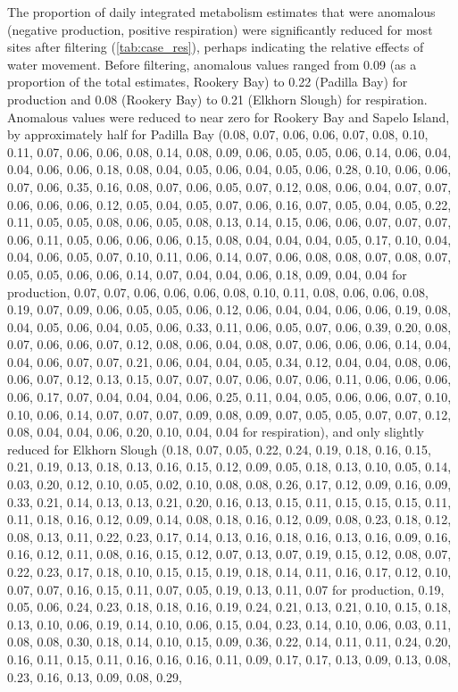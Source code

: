 \documentclass[letterpaper,12pt,oneside]{article}\usepackage[]{graphicx}\usepackage[]{color}
\begin{document}
The proportion of daily integrated metabolism estimates that were anomalous (negative production, positive respiration) were significantly reduced for most sites after filtering (\cref{tab:case_res}), perhaps indicating the relative effects of water movement.  Before filtering, anomalous values ranged from 0.09 (as a proportion of the total estimates, Rookery Bay) to 0.22 (Padilla Bay) for production and 0.08 (Rookery Bay) to 0.21 (Elkhorn Slough) for respiration. Anomalous values were reduced to near zero for Rookery Bay and Sapelo Island, by approximately half for Padilla Bay (0.08, 0.07, 0.06, 0.06, 0.07, 0.08, 0.10, 0.11, 0.07, 0.06, 0.06, 0.08, 0.14, 0.08, 0.09, 0.06, 0.05, 0.05, 0.06, 0.14, 0.06, 0.04, 0.04, 0.06, 0.06, 0.18, 0.08, 0.04, 0.05, 0.06, 0.04, 0.05, 0.06, 0.28, 0.10, 0.06, 0.06, 0.07, 0.06, 0.35, 0.16, 0.08, 0.07, 0.06, 0.05, 0.07, 0.12, 0.08, 0.06, 0.04, 0.07, 0.07, 0.06, 0.06, 0.06, 0.12, 0.05, 0.04, 0.05, 0.07, 0.06, 0.16, 0.07, 0.05, 0.04, 0.05, 0.22, 0.11, 0.05, 0.05, 0.08, 0.06, 0.05, 0.08, 0.13, 0.14, 0.15, 0.06, 0.06, 0.07, 0.07, 0.07, 0.06, 0.11, 0.05, 0.06, 0.06, 0.06, 0.15, 0.08, 0.04, 0.04, 0.04, 0.05, 0.17, 0.10, 0.04, 0.04, 0.06, 0.05, 0.07, 0.10, 0.11, 0.06, 0.14, 0.07, 0.06, 0.08, 0.08, 0.07, 0.08, 0.07, 0.05, 0.05, 0.06, 0.06, 0.14, 0.07, 0.04, 0.04, 0.06, 0.18, 0.09, 0.04, 0.04 for production, 0.07, 0.07, 0.06, 0.06, 0.06, 0.08, 0.10, 0.11, 0.08, 0.06, 0.06, 0.08, 0.19, 0.07, 0.09, 0.06, 0.05, 0.05, 0.06, 0.12, 0.06, 0.04, 0.04, 0.06, 0.06, 0.19, 0.08, 0.04, 0.05, 0.06, 0.04, 0.05, 0.06, 0.33, 0.11, 0.06, 0.05, 0.07, 0.06, 0.39, 0.20, 0.08, 0.07, 0.06, 0.06, 0.07, 0.12, 0.08, 0.06, 0.04, 0.08, 0.07, 0.06, 0.06, 0.06, 0.14, 0.04, 0.04, 0.06, 0.07, 0.07, 0.21, 0.06, 0.04, 0.04, 0.05, 0.34, 0.12, 0.04, 0.04, 0.08, 0.06, 0.06, 0.07, 0.12, 0.13, 0.15, 0.07, 0.07, 0.07, 0.06, 0.07, 0.06, 0.11, 0.06, 0.06, 0.06, 0.06, 0.17, 0.07, 0.04, 0.04, 0.04, 0.06, 0.25, 0.11, 0.04, 0.05, 0.06, 0.06, 0.07, 0.10, 0.10, 0.06, 0.14, 0.07, 0.07, 0.07, 0.09, 0.08, 0.09, 0.07, 0.05, 0.05, 0.07, 0.07, 0.12, 0.08, 0.04, 0.04, 0.06, 0.20, 0.10, 0.04, 0.04 for respiration), and only slightly reduced for Elkhorn Slough (0.18, 0.07, 0.05, 0.22, 0.24, 0.19, 0.18, 0.16, 0.15, 0.21, 0.19, 0.13, 0.18, 0.13, 0.16, 0.15, 0.12, 0.09, 0.05, 0.18, 0.13, 0.10, 0.05, 0.14, 0.03, 0.20, 0.12, 0.10, 0.05, 0.02, 0.10, 0.08, 0.08, 0.26, 0.17, 0.12, 0.09, 0.16, 0.09, 0.33, 0.21, 0.14, 0.13, 0.13, 0.21, 0.20, 0.16, 0.13, 0.15, 0.11, 0.15, 0.15, 0.15, 0.11, 0.11, 0.18, 0.16, 0.12, 0.09, 0.14, 0.08, 0.18, 0.16, 0.12, 0.09, 0.08, 0.23, 0.18, 0.12, 0.08, 0.13, 0.11, 0.22, 0.23, 0.17, 0.14, 0.13, 0.16, 0.18, 0.16, 0.13, 0.16, 0.09, 0.16, 0.16, 0.12, 0.11, 0.08, 0.16, 0.15, 0.12, 0.07, 0.13, 0.07, 0.19, 0.15, 0.12, 0.08, 0.07, 0.22, 0.23, 0.17, 0.18, 0.10, 0.15, 0.15, 0.19, 0.18, 0.14, 0.11, 0.16, 0.17, 0.12, 0.10, 0.07, 0.07, 0.16, 0.15, 0.11, 0.07, 0.05, 0.19, 0.13, 0.11, 0.07 for production, 0.19, 0.05, 0.06, 0.24, 0.23, 0.18, 0.18, 0.16, 0.19, 0.24, 0.21, 0.13, 0.21, 0.10, 0.15, 0.18, 0.13, 0.10, 0.06, 0.19, 0.14, 0.10, 0.06, 0.15, 0.04, 0.23, 0.14, 0.10, 0.06, 0.03, 0.11, 0.08, 0.08, 0.30, 0.18, 0.14, 0.10, 0.15, 0.09, 0.36, 0.22, 0.14, 0.11, 0.11, 0.24, 0.20, 0.16, 0.11, 0.15, 0.11, 0.16, 0.16, 0.16, 0.11, 0.09, 0.17, 0.17, 0.13, 0.09, 0.13, 0.08, 0.23, 0.16, 0.13, 0.09, 0.08, 0.29, 
\end{document}
